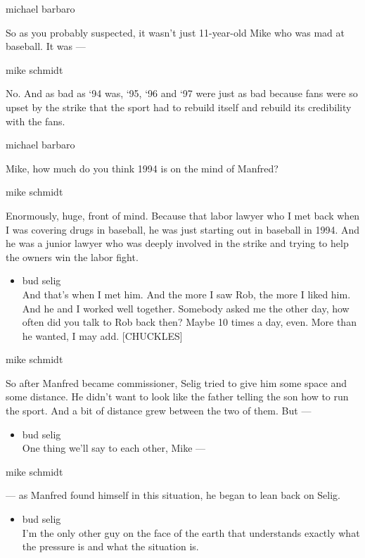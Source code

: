 michael barbaro

So as you probably suspected, it wasn't just 11-year-old Mike who was
mad at baseball. It was ---

mike schmidt

No. And as bad as `94 was, `95, `96 and `97 were just as bad because
fans were so upset by the strike that the sport had to rebuild itself
and rebuild its credibility with the fans.

michael barbaro

Mike, how much do you think 1994 is on the mind of Manfred?

mike schmidt

Enormously, huge, front of mind. Because that labor lawyer who I met
back when I was covering drugs in baseball, he was just starting out in
baseball in 1994. And he was a junior lawyer who was deeply involved in
the strike and trying to help the owners win the labor fight.

\begin{itemize}
\tightlist
\item
  bud selig\\
  And that's when I met him. And the more I saw Rob, the more I liked
  him. And he and I worked well together. Somebody asked me the other
  day, how often did you talk to Rob back then? Maybe 10 times a day,
  even. More than he wanted, I may add. {[}CHUCKLES{]}
\end{itemize}

mike schmidt

So after Manfred became commissioner, Selig tried to give him some space
and some distance. He didn't want to look like the father telling the
son how to run the sport. And a bit of distance grew between the two of
them. But ---

\begin{itemize}
\tightlist
\item
  bud selig\\
  One thing we'll say to each other, Mike ---
\end{itemize}

mike schmidt

--- as Manfred found himself in this situation, he began to lean back on
Selig.

\begin{itemize}
\tightlist
\item
  bud selig\\
  I'm the only other guy on the face of the earth that understands
  exactly what the pressure is and what the situation is.
\end{itemize}

